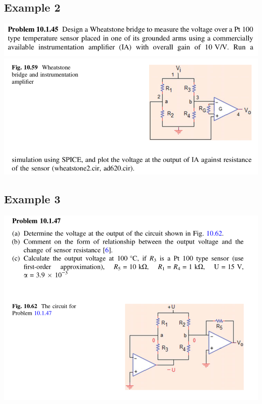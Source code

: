 \documentclass[11pt]{book}
\begin{document}
\subsection{Example 2}
\begin{center}
	\includegraphics[width=\textwidth]{figures/q3.22.png} \\
	\includegraphics[width=\textwidth]{figures/q3.23.png}
\end{center}
\newpage
\subsection{Example 3}
\begin{center}
	\includegraphics[width=\textwidth]{figures/q3.24.png} 
\end{center}

\newpage
\end{document}
